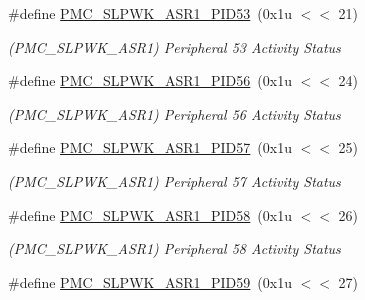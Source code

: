 \begin{DoxyCompactItemize}
\mbox{\label{group__SAMV71__PMC_ga65d68f06f2edea6a4d2b5cfa62c37227}} 
\#define \mbox{\hyperlink{group__SAMV71__PMC_ga65d68f06f2edea6a4d2b5cfa62c37227}{P\+M\+C\+\_\+\+S\+L\+P\+W\+K\+\_\+\+A\+S\+R1\+\_\+\+P\+I\+D53}}~(0x1u $<$$<$ 21)
\begin{DoxyCompactList}\small\item\em (P\+M\+C\+\_\+\+S\+L\+P\+W\+K\+\_\+\+A\+S\+R1) Peripheral 53 Activity Status \end{DoxyCompactList}\item 
\mbox{\label{group__SAMV71__PMC_ga2676e54cd88cce57d6b1ba09f7c3c866}} 
\#define \mbox{\hyperlink{group__SAMV71__PMC_ga2676e54cd88cce57d6b1ba09f7c3c866}{P\+M\+C\+\_\+\+S\+L\+P\+W\+K\+\_\+\+A\+S\+R1\+\_\+\+P\+I\+D56}}~(0x1u $<$$<$ 24)
\begin{DoxyCompactList}\small\item\em (P\+M\+C\+\_\+\+S\+L\+P\+W\+K\+\_\+\+A\+S\+R1) Peripheral 56 Activity Status \end{DoxyCompactList}\item 
\mbox{\label{group__SAMV71__PMC_ga67274aa2482ed51d2cd0e0cc6d41a1d5}} 
\#define \mbox{\hyperlink{group__SAMV71__PMC_ga67274aa2482ed51d2cd0e0cc6d41a1d5}{P\+M\+C\+\_\+\+S\+L\+P\+W\+K\+\_\+\+A\+S\+R1\+\_\+\+P\+I\+D57}}~(0x1u $<$$<$ 25)
\begin{DoxyCompactList}\small\item\em (P\+M\+C\+\_\+\+S\+L\+P\+W\+K\+\_\+\+A\+S\+R1) Peripheral 57 Activity Status \end{DoxyCompactList}\item 
\mbox{\label{group__SAMV71__PMC_ga1291144e3aa0588181e47e24603781c1}} 
\#define \mbox{\hyperlink{group__SAMV71__PMC_ga1291144e3aa0588181e47e24603781c1}{P\+M\+C\+\_\+\+S\+L\+P\+W\+K\+\_\+\+A\+S\+R1\+\_\+\+P\+I\+D58}}~(0x1u $<$$<$ 26)
\begin{DoxyCompactList}\small\item\em (P\+M\+C\+\_\+\+S\+L\+P\+W\+K\+\_\+\+A\+S\+R1) Peripheral 58 Activity Status \end{DoxyCompactList}\item 
\mbox{\label{group__SAMV71__PMC_gaae9a7012faa614368ff01d54ab17e1cd}} 
\#define \mbox{\hyperlink{group__SAMV71__PMC_gaae9a7012faa614368ff01d54ab17e1cd}{P\+M\+C\+\_\+\+S\+L\+P\+W\+K\+\_\+\+A\+S\+R1\+\_\+\+P\+I\+D59}}~(0x1u $<$$<$ 27)
$$
\end{DoxyCompactItemize}
